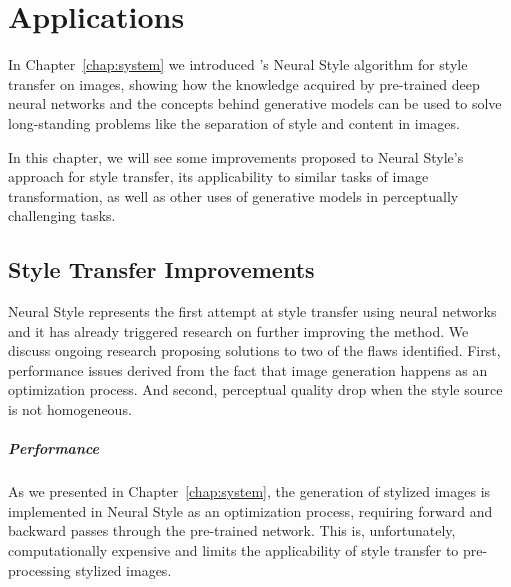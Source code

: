 
\chapter{Applications}
\label{chap:applications}




In Chapter~\ref{chap:system} we introduced \citeauthor{Gatys2015B}'s Neural Style algorithm for style transfer on images, showing how the knowledge acquired by pre-trained deep neural networks and the concepts behind generative models can be used to solve long-standing problems like the separation of style and content in images.

In this chapter, we will see some improvements proposed to Neural Style's approach for style transfer, its applicability to similar tasks of image transformation, as well as other uses of generative models in perceptually challenging tasks.



\section{Style Transfer Improvements}
\label{sec:applications:improvements}

Neural Style represents the first attempt at style transfer using neural networks and it has already triggered research on further improving the method.
We discuss ongoing research proposing solutions to two of the flaws identified.
First, performance issues derived from the fact that image generation happens as an optimization process.
And second, perceptual quality drop when the style source is not homogeneous.

\paragraph{Performance}
As we presented in Chapter~\ref{chap:system}, the generation of stylized images is implemented in Neural Style as an optimization process, requiring forward and backward passes through the pre-trained network.
This is, unfortunately, computationally expensive and limits the applicability of style transfer to pre-processing stylized images.

